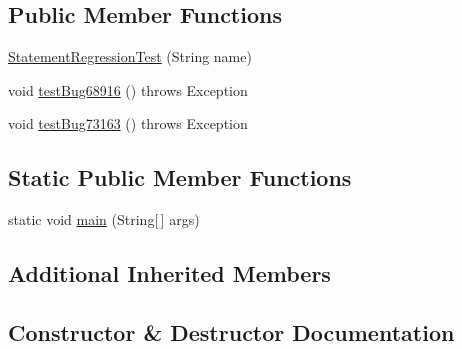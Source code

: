 \subsection*{Public Member Functions}
\begin{DoxyCompactItemize}
\item 
\mbox{\hyperlink{classtestsuite_1_1regression_1_1jdbc4_1_1_statement_regression_test_a6ba7872d1c9f3f47ea05610e9d1faf08}{Statement\+Regression\+Test}} (String name)
\item 
void \mbox{\hyperlink{classtestsuite_1_1regression_1_1jdbc4_1_1_statement_regression_test_ad8ad2771f5274586204b1b6317699c31}{test\+Bug68916}} ()  throws Exception 
\item 
void \mbox{\hyperlink{classtestsuite_1_1regression_1_1jdbc4_1_1_statement_regression_test_a787d86c71bb2f79af1594e419fd382d3}{test\+Bug73163}} ()  throws Exception 
\end{DoxyCompactItemize}
\subsection*{Static Public Member Functions}
\begin{DoxyCompactItemize}
\item 
static void \mbox{\hyperlink{classtestsuite_1_1regression_1_1jdbc4_1_1_statement_regression_test_a312fe3e3cb32a58d3a52addcb4e1dba2}{main}} (String\mbox{[}$\,$\mbox{]} args)
\end{DoxyCompactItemize}
\subsection*{Additional Inherited Members}


\subsection{Constructor \& Destructor Documentation}
\mbox{\label{classtestsuite_1_1regression_1_1jdbc4_1_1_statement_regression_test_a6ba7872d1c9f3f47ea05610e9d1faf08}} 
